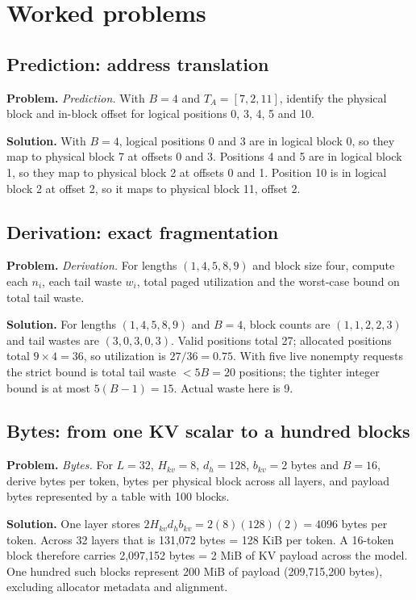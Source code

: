\section{Worked problems}

\subsection{Prediction: address translation}
\textbf{Problem.} \emph{Prediction.} With $B=4$ and $T_A=[7,2,11]$, identify the physical
block and in-block offset for logical positions 0, 3, 4, 5 and 10.

\textbf{Solution.} With $B=4$, logical positions 0 and 3 are in logical block 0, so they map to
physical block 7 at offsets 0 and 3. Positions 4 and 5 are in logical block 1,
so they map to physical block 2 at offsets 0 and 1. Position 10 is in logical
block 2 at offset 2, so it maps to physical block 11, offset 2.

\subsection{Derivation: exact fragmentation}
\textbf{Problem.} \emph{Derivation.} For lengths $(1,4,5,8,9)$ and block size four,
compute each $n_i$, each tail waste $w_i$, total paged utilization and the
worst-case bound on total tail waste.

\textbf{Solution.} For lengths $(1,4,5,8,9)$ and $B=4$, block counts are $(1,1,2,2,3)$ and tail
wastes are $(3,0,3,0,3)$. Valid positions total 27; allocated positions total
$9\times4=36$, so utilization is $27/36=0.75$. With five live nonempty
requests the strict bound is total tail waste $<5B=20$ positions; the tighter
integer bound is at most $5(B-1)=15$. Actual waste here is 9.

\subsection{Bytes: from one KV scalar to a hundred blocks}
\textbf{Problem.} \emph{Bytes.} For $L=32$, $H_{kv}=8$, $d_h=128$, $b_{kv}=2$ bytes and
$B=16$, derive bytes per token, bytes per physical block across all layers,
and payload bytes represented by a table with 100 blocks.

\textbf{Solution.} One layer stores
$2H_{kv}d_hb_{kv}=2(8)(128)(2)=4096$ bytes per token. Across 32 layers that is
131,072 bytes = 128 KiB per token. A 16-token block therefore carries
2,097,152 bytes = 2 MiB of KV payload across the model. One hundred such
blocks represent 200 MiB of payload (209,715,200 bytes), excluding allocator
metadata and alignment.

